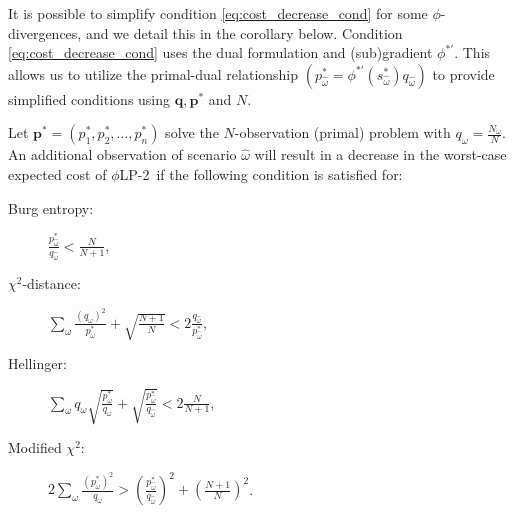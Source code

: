 \documentclass[opre,nonblindrev]{informs3} %
\newcommand{\q}{\mathbf{q}}
\newcommand{\p}{\mathbf{p}}
\newcommand{\plp}{$\phi$LP-2}
\begin{document}

It is possible to simplify condition \eqref{eq:cost_decrease_cond} for some $\phi$-divergences, and we detail this in the corollary below. 
Condition \eqref{eq:cost_decrease_cond} uses the dual formulation and (sub)gradient $\phi^{* \prime}$. 
This allows us to utilize the primal-dual relationship $\left(p_{\hat{\omega}}^* = \phi^{* \prime}(s_{\hat{\omega}}^*) q_{\hat{\omega}}\right)$ to provide simplified conditions using $\q,\p^*$ and $N$. 


\begin{corollary}
	\label{cor:cost_decrease_trick}
	Let $\p^*=(p_1^*, p_2^*,\ldots, p_n^*)$ solve the $N$-observation (primal) problem with $q_\omega = \tfrac{N_\omega}{N}$.
	An additional observation of scenario $\hat{\omega}$ will result in a decrease in the worst-case expected cost of \plp\ if the following condition is satisfied for:\vspace*{-0.1in}
	\begin{multicols}{2}
		\begin{description}
			\item[Burg entropy:] $\frac{p_{\hat{\omega}}^*}{q_{\hat{\omega}}} < \frac{N}{N+1}$, %
			\item[$\chi^2$-distance:]  $\sum_\omega \frac{(q_\omega)^2}{p_\omega^*} + \sqrt{\frac{N+1}{N}} < 2 \frac{q_{\hat{\omega}}}{p_{\hat{\omega}}^*}$,
			\item[Hellinger:] $\sum_\omega q_\omega \sqrt{\frac{p_\omega^*}{q_\omega}} + \sqrt{\frac{p_{\hat{\omega}}^*}{q_{\hat{\omega}}}} < 2 \frac{N}{N+1}$,
			\item[Modified $\chi^2$:] $2 \sum_\omega \frac{(p_\omega^*)^2}{q_\omega} > \left(\frac{p_{\hat{\omega}}^*}{q_{\hat{\omega}}}\right)^2 + \left(\frac{N+1}{N}\right)^2$.
		\end{description}
	\end{multicols}
\end{corollary}
\end{document}
